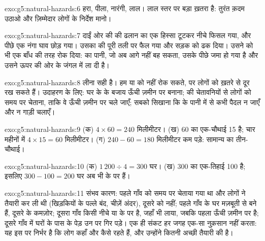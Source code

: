 \begin{solution}{exo:g5:natural-hazards:6}
हरा, पीला, नारंगी, लाल। लाल स्तर पर बड़ा ख़तरा है: तुरंत क़दम उठाओ और ज़िम्मेदार
लोगों के निर्देश मानो।
\end{solution}

\begin{solution}{exo:g5:natural-hazards:7}
दाईं ओर की  की ढलान का एक हिस्सा टूटकर नीचे फिसल गया, और पीछे एक नंगा घाव
छोड़ गया। उसका   की पूरी तली पर फैल गया और सड़क को ढक दिया। उसने  को
भी एक बाँध की तरह रोक दिया:  का पानी, जो अब आगे नहीं बह सकता, उसके पीछे जमा हो
गया है और उसने ऊपर की ओर के जंगल में  ला दी है।
\end{solution}

\begin{solution}{exo:g5:natural-hazards:8}
लीना सही है। हम  या  को नहीं रोक सकते, पर लोगों को ख़तरे से दूर रख सकते
हैं। उदाहरण के लिए: घर  के  के बजाय ऊँची ज़मीन पर बनाना;  की
चेतावनियों से लोगों को समय पर चेताना, ताकि वे ऊँची ज़मीन पर चले जाएँ; सबको
सिखाना कि  के पानी में से कभी पैदल न जाएँ और न गाड़ी
चलाएँ।
\end{solution}

\begin{solution}{exo:g5:natural-hazards:9}
(क) $4 \times 60 = 240$ मिलीमीटर। (ख) 60 का एक-चौथाई 15 है; चार
महीनों में $4 \times 15 = 60$ मिलीमीटर। (ग) $240 - 60 = 180$ मिलीमीटर
कम पड़े: सामान्य  का तीन-चौथाई।
\end{solution}

\begin{solution}{exo:g5:natural-hazards:10}
(क) $1\,200 \div 4 = 300$ घर। (ख) 300 का एक-तिहाई 100 है; इसलिए
$300 - 100 = 200$ घर अब भी  के  पर हैं।
\end{solution}

\begin{solution}{exo:g5:natural-hazards:11}
संभव कारण: पहले गाँव को समय पर चेताया गया था और लोगों ने तैयारी कर ली थी
(खिड़कियों के पल्ले बंद, चीज़ें अंदर), दूसरे को नहीं; पहले गाँव के घर मज़बूती से बने
हैं, दूसरे के कमज़ोर; दूसरा गाँव किसी नीचे  या  के  पर है, जहाँ 
 भी लाया, जबकि पहला ऊँची ज़मीन पर है; दूसरे गाँव में घरों के पास के पेड़ उन पर
गिर पड़े। एक ही संकट हर जगह एक-सा नुक़सान नहीं करता: यह इस पर निर्भर है कि लोग कहाँ
और कैसे रहते हैं, और उन्होंने कितनी अच्छी
तैयारी की है।
\end{solution}
